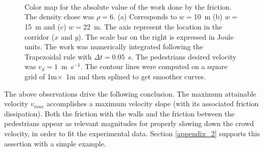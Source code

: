 \documentclass[preprint,12pt]{elsarticle}
\begin{document}
\begin{figure}[!htbp]
\centering
    \\ 
    \\
    \
\caption[width=0.47\columnwidth] {Color map for the absolute value of the work done by the friction. The density chose was $\rho=6$. (a) Corresponds to $w=$10~m (b) $w=$15~m and (c) $w=$22~m. The axis represent the location in the corridor ($x$ and $y$). The scale bar on the right is expressed in Joule units. The work was numerically integrated following the Trapezoidal rule with $\Delta t =0.05$~s. The pedestrians desired velocity was $v_d = 1$~m~s$^{-1}$. The contour lines were computed on a square grid of 1m$\times$~1m and then splined to get smoother curves.} 
\label{abswg}
\end{figure}

The above observations drive the following conclusion. The maximum attainable velocity $v_{max}$ accomplishes a maximum velocity slope (with its associated friction dissipation). Both the friction with the walls and the friction between the pedestrians appear as relevant magnitudes for properly slowing down the crowd velocity, in order to fit the experimental data. Section \ref{appendix_2} supports this assertion with a simple example.  
\end{document}
